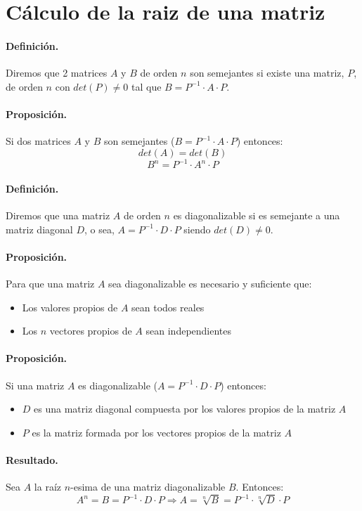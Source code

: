 
\section{C\'alculo de la raiz de una matriz}

\paragraph{Definici\'on.}
Diremos que 2 matrices $A$ y $B$ de orden $n$ son semejantes si existe una 
matriz, $P$, de orden $n$ con $det(P) \neq 0$ tal que 
$B = P^{-1} \cdot A \cdot P$.


\paragraph{Proposici\'on.} Si dos matrices $A$ y $B$ son semejantes 
($B = P^{-1} \cdot A \cdot P$) entonces:
\begin{displaymath}
det(A) = det(B)
\end{displaymath}
\begin{displaymath}
B^n = P^{-1} \cdot A^{n} \cdot P
\end{displaymath}

\paragraph{Definici\'on.} 
Diremos que una matriz $A$ de orden $n$ es diagonalizable si es semejante a una 
matriz diagonal $D$, o sea, $A = P^{-1} \cdot D \cdot P$ siendo $det(D) \neq 0$.

\paragraph{Proposici\'on.} 
Para que una matriz $A$ sea diagonalizable es necesario y suficiente que:
\begin{itemize}
\item Los valores propios de $A$ sean todos reales
\item Los $n$ vectores propios de $A$ sean independientes
\end{itemize}

\paragraph{Proposici\'on.}
Si una matriz $A$ es diagonalizable ($A = P^{-1} \cdot D \cdot P$) entonces: 
\begin{itemize}
\item $D$ es una matriz diagonal compuesta por los valores propios de la matriz $A$
\item $P$ es la matriz formada por los vectores propios de la matriz $A$
\end{itemize}

\paragraph{Resultado.}
Sea $A$ la ra\'iz $n$-esima de una matriz diagonalizable $B$. Entonces:
\begin{displaymath}
A^n = B = P^{-1} \cdot D \cdot P 
\Longrightarrow  
A = \sqrt[n]{B} = P^{-1} \cdot \sqrt[n]{D} \cdot P
\end{displaymath} 

